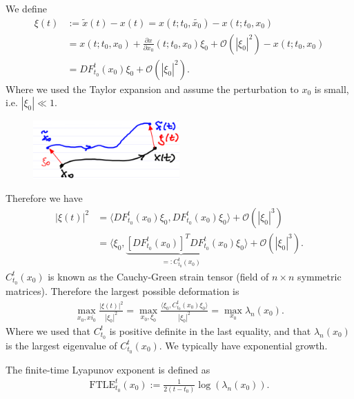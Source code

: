 \begin{ex}
	We define 
	\begin{align}
		\xi(t) &:= \tilde{x}(t) - x(t) = x(t; t_0, \tilde{x_0}) - x(t; t_0, x_0)\\
		       &= x(t; t_0, x_0) + \frac{\partial x}{\partial x_0}(t; t_0, x_0)\xi_0 + \mathcal{O}(|\xi_0|^2) - x(t; t_0, x_0) \\
		       &= DF_{t_0}^{t}(x_0)\xi_0 + \mathcal{O}(|\xi_0|^2).
	\end{align}
	Where we used the Taylor expansion and assume the perturbation to $x_0$ is small, i.e. $|\xi_0| \ll 1$.
	\begin{figure}[h]
		\centering
		\includegraphics[width=0.5\textwidth]{figures/ch1/8dispersion.png}
	\end{figure}
	Therefore we have
	\begin{align}
		|\xi(t)|^2 &= \langle DF_{t_0}^{t}(x_0) \xi_0, DF_{t_0}^{t}(x_0)\xi_0 \rangle + \mathcal{O}(|\xi_0|^3) \\
			   &= \langle \xi_0, \underbrace{\left[ DF_{t_0}^{t}(x_0) \right]^T DF_{t_0}^{t}(x_0)}_{=: C_{t_0}^{t}(x_0)} \xi_0 \rangle + \mathcal{O}(|\xi_0|^3).
	\end{align}
	$C_{t_0}^{t}(x_0)$ is known as the Cauchy-Green strain tensor (field of $n\times n$ symmetric matrices).
	Therefore the largest possible deformation is
	\begin{align}
		\max_{x_0, xi_0} \frac{|\xi(t)|^2}{|\xi_0|^2} = \max_{x_0, \xi_0}\frac{\langle \xi_0, C_{t_0}^{t}(x_0) \xi_0 \rangle}{|\xi_0|^2} = \max_{x_0} \lambda_{n}(x_0).
	\end{align}
	Where we used that $C_{t_0}^{t}$ is positive definite in the last equality, and that $\lambda_n(x_0)$ is the largest eigenvalue of $C_{t_0}^{t}(x_0)$. We typically have exponential growth.	
\end{ex}
\begin{definition}
	The finite-time Lyapunov exponent is defined as
	\begin{align}
		\boxed{ \textrm{FTLE} _{t_0}^{t}(x_0) := \frac{1}{2(t-t_0)} \log(\lambda_n(x_0)).}
	\end{align}
\end{definition}
